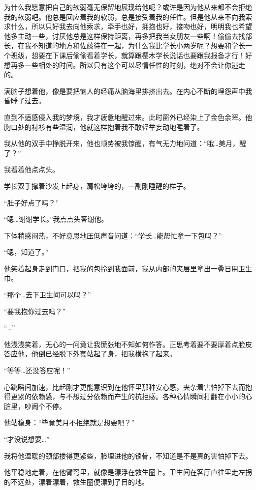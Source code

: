 为什么我愿意把自己的软弱毫无保留地展现给他呢？或许是因为他从来都不会拒绝我的软弱吧。他总是回应着我的软弱，总是接受着我的任性。但是他从来不向我索求什么，所以只好我去向他索求，牵手也好，拥抱也好，接吻也好，明明我也希望他多主动一些，讨厌他总是这样保持距离，再多把我当女朋友一些啊！偷偷去找部长，在我不知道的地方和佐藤待在一起，为什么我比学长小两岁呢？想要和学长一个班级，想要在下课后偷偷看着学长，就算跟樱木学长说话也要跟我报备才行！好想再多一些相处的时间。所以只有这个可以尽情任性的时刻，绝对不会让你逃走的。

满脑子想着他，像是要把恼人的经痛从脑海里排挤出去。在内心不断的埋怨声中我昏睡了过去。

\cutlinef{\zzz}

\newday{\cloudy\sunset}

直到不适感侵入我的梦境，我才疲惫地醒过来。此时窗外已经染上了金色余晖。他胸口处的衬衫有些湿润，他就这样抱着我不敢轻举妄动地睡着了。

我从他的双手中挣脱开来，他也顺势被我惊醒，有气无力地问道：“哦…美月，醒了？”

我看着他点点头。

学长双手撑着沙发上起身，肩松垮垮的，一副刚睡醒的样子。

“肚子好点了吗？”

“嗯…谢谢学长。”我点点头答谢他。

下体稍感闷热，不好意思地压低声音问道：“学长…能帮忙拿一下包吗？”

“嗯，知道了。”

他笑着起身走到门口，把我的包拎到我面前，我从内部的夹层里拿出一叠日用卫生巾。

“那个…去下卫生间可以吗？”

“要我抱你过去吗？”

“…”

他浅浅笑着，无心的一问竟让我慌张地不知如何作答。正思考着要不要厚着点脸皮答应他，他倒已经脱下外套站起了身，把我横抱了起来。

“等等…还没答应呢！”

心跳瞬间加速，比起刚才更能意识到在他怀里那种安心感，夹杂着害怕掉下去而抱得更紧的依赖感，与不想过分依赖而产生的抗拒感。各种心情瞬间打翻在小小的心脏里，吵闹个不停。

他站稳身：“毕竟美月不拒绝就是想要吧？”

“才没说想要…”

我将他温暖的颈部搂得更紧些，脸埋进他的锁骨，不知道是不是真的害怕掉下去。

他平稳地走着，在他臂弯里，就像是漂浮在救生圈上。卫生间在客厅直往里走左拐的不远处，漂着漂着，救生圈便漂到了目的地。

